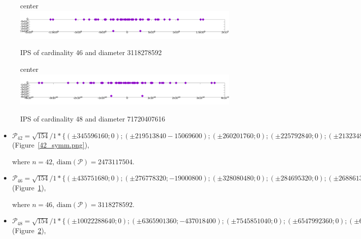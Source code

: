 \documentclass[12pt]{article}
\theoremstyle{theorem}
\theoremstyle{dfn}
\theoremstyle{remark}
\begin{document}
\begin{figure}[h!]
center{\includegraphics[width=1\linewidth]{./img/46_symm.png}}
\parbox{1\linewidth}{\caption{IPS of cardinality 46 and diameter 3118278592}
\label{46_symm.png}}
\end{figure}

\begin{figure}[h!]
center{\includegraphics[width=1\linewidth]{./img/48_symm.png}}
\parbox{1\linewidth}{\caption{IPS of cardinality 48 and diameter 71720407616}
\label{48_symm.png}}
\end{figure}

\begin{itemize}
\setlength{\itemsep}{-1mm}


\item
$\mathcal{P_42}=\sqrt{154}/{1} * \{ (\pm 345596160; 0);
(\pm219513840 -15069600);
(\pm260201760; 0);
(\pm225792840; 0);
(\pm213234840; 0);
(\pm153961080; 0);
(\pm144668160; 0
(\pm25116000; 0);
(\pm694026840; 0);
(\pm514710560; 0);
(\pm359116940; 0);
(\pm13423904; 0);
(\pm75682880; 0);
(\pm464143680; 0);
(\pm827069880; 0);
(\pm92144325; 0);
(\pm1195180740; 0);
(\pm1236558752; 0);
(\pm44590560; 0);
(\pm339925740; 0);
(\pm117312468; 0)\}
$
(Figure~\ref{42_symm.png}),

where $n = 42$, $\operatorname{diam(\mathcal{P})} = 2473117504$.


\item
$\mathcal{P_46}=\sqrt{154}/{1} * \{ (\pm435751680; 0);
(\pm276778320; -19000800);
(\pm328080480; 0);
(\pm284695320; 0);
(\pm268861320; 0);
(\pm194124840; 0);
(\pm182407680; 0);
(\pm31668000; 0);
(\pm1559139296; 0);
(\pm1506967020; 0);
(\pm1042827240; 0);
(\pm875077320; 0);
(\pm648982880; 0);
(\pm585224640; 0);
(\pm452799620; 0);
(\pm95426240; 0);
(\pm16925792; 0);
(\pm116181975; 0);
(\pm428602020; 0);
(\pm56222880; 0);
(\pm769560480; 0);
(\pm626458560; 0);
(\pm130761918; 0)\}
$
(Figure~\ref{46_symm.png}),

where $n = 46$, $\operatorname{diam(\mathcal{P})} = 3118278592$.

\item
$\mathcal{P_48}=\sqrt{154}/{1} * \{ (\pm10022288640; 0);
( \pm6365901360 ; -437018400);
( \pm7545851040 ; 0);
( \pm6547992360 ; 0);
( \pm6183810360 ; 0);
( \pm4464871320 ; 0);
( \pm4195376640 ; 0);
( \pm728364000 ; 0);
( \pm35860203808 ; 0);
( \pm34660241460 ; 0);
( \pm23985026520 ; 0);
( \pm20126778360 ; 0);
( \pm14926606240 ; 0);
( \pm13460166720 ; 0);
( \pm10414391260 ; 0);
( \pm2194803520 ; 0);
( \pm389293216 ; 0);
( \pm2672185425 ; 0);
( \pm9857846460 ; 0);
( \pm1293126240 ; 0);
( \pm17699891040 ; 0);
( \pm14408546880 ; 0);
( \pm3007524114 ; 0);
( \pm3402061572 ; 0)\}
$
(Figure~\ref{48_symm.png}),

\end{itemize}
\end{document}
